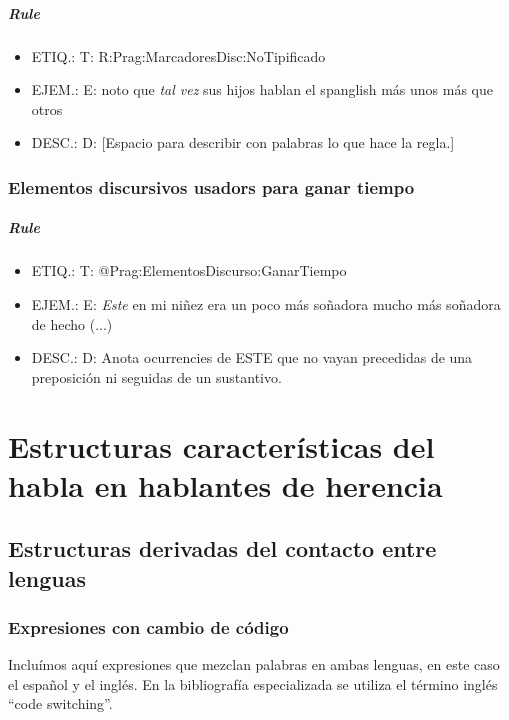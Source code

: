 \documentclass[11pt]{report}
\begin{document}
\paragraph*{Rule}
\begin{itemize}
\item ETIQ.:  T: R:Prag:MarcadoresDisc:NoTipificado
\item EJEM.:  E: noto que \emph{tal vez} sus hijos hablan el spanglish más unos más que otros
\item DESC.:  D: [Espacio para describir con palabras lo que hace la regla.]
\end{itemize}

\subsection{Elementos discursivos usadors para ganar tiempo}
\paragraph*{Rule}
\begin{itemize}
\item ETIQ.:  T: @Prag:ElementosDiscurso:GanarTiempo
\item EJEM.:  E: \emph{Este} en mi niñez era un poco más soñadora mucho más soñadora de hecho (...)
\item DESC.:  D: Anota ocurrencies de ESTE que no vayan precedidas de una preposición ni seguidas de un sustantivo.
\end{itemize}

\chapter{Estructuras características del habla en hablantes de herencia}
\section{Estructuras derivadas del contacto entre lenguas}
\subsection{Expresiones con cambio de código}
Incluímos aquí expresiones que mezclan palabras en ambas lenguas, en este caso el español y el inglés. En la bibliografía especializada se utiliza el término inglés ``code switching''.
\end{document}
